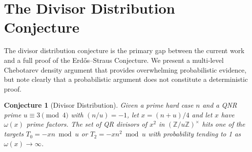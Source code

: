 \documentclass[11pt,a4paper]{article}
\theoremstyle{plain}
\theoremstyle{plain}
\newtheorem{conjecture}[theorem]{Conjecture}
\theoremstyle{definition}
\numberwithin{equation}{section}
\begin{document}
\clearpage

\section{The Divisor Distribution Conjecture}

The divisor distribution conjecture is the primary gap between the current work and a full proof of the Erd\H{o}s--Straus Conjecture. We present a multi-level Chebotarev density argument that provides overwhelming probabilistic evidence, but note clearly that a probabilistic argument does not constitute a deterministic proof.

\begin{conjecture}[Divisor Distribution]\label{conj:divisor-dist}
Given a prime hard case $n$ and a QNR prime $u \equiv 3 \pmod{4}$ with $(n/u) = -1$, let $x = (n+u)/4$ and let $x$ have $\omega(x)$ prime factors. The set of QR divisors of $x^2$ in $(\mathbb{Z}/u\mathbb{Z})^\times$ hits one of the targets $T_0 = -xn \bmod u$ or $T_2 = -xn^2 \bmod u$ with probability tending to 1 as $\omega(x) \to \infty$.
\end{conjecture}
\end{document}
